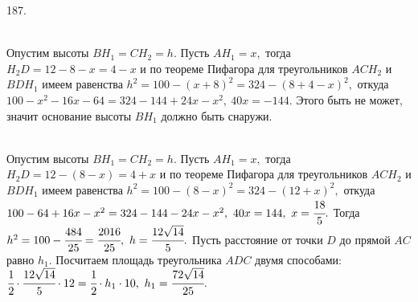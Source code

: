 187. \begin{figure}[ht!]
\end{figure}\\
Опустим высоты $BH_1=CH_2=h.$ Пусть $AH_1=x,$ тогда $H_2D=12-8-x=4-x$ и по теореме Пифагора для треугольников $ACH_2$ и $BDH_1$ имеем равенства
$h^2=100-(x+8)^2=324-(8+4-x)^2,$ откуда $100-x^2-16x-64=324-144+24x-x^2,\ 40x=-144.$ Этого быть не может, значит основание высоты $BH_1$ должно быть снаружи.\\
 \begin{figure}[ht!]
\end{figure}\\
Опустим высоты $BH_1=CH_2=h.$ Пусть $AH_1=x,$ тогда $H_2D=12-(8-x)=4+x$ и по теореме Пифагора для треугольников $ACH_2$ и $BDH_1$ имеем равенства
$h^2=100-(8-x)^2=324-(12+x)^2,$ откуда $100-64+16x-x^2=324-144-24x-x^2,\ 40x=144,\ x=\cfrac{18}{5}.$ Тогда $h^2=100-\cfrac{484}{25}=\cfrac{2016}{25},\ h=\cfrac{12\sqrt{14}}{5}.$ Пусть расстояние от точки $D$ до прямой $AC$ равно $h_1.$ Посчитаем площадь треугольника $ADC$ двумя способами:
$\cfrac{1}{2}\cdot\cfrac{12\sqrt{14}}{5}\cdot12=
\cfrac{1}{2}\cdot h_1\cdot10,\ h_1=\cfrac{72\sqrt{14}}{25}.$\\
